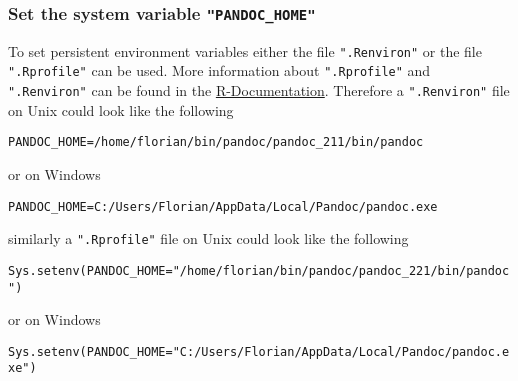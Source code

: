 \documentclass[a4paper]{article}\usepackage[]{graphicx}\usepackage[]{color}
\makeatletter
\newcommand{\hlstr}[1]{\textcolor[rgb]{0.741,0.553,0.545}{#1}}%
\newcommand{\hlstd}[1]{\textcolor[rgb]{0,0,0}{#1}}%
\newcommand{\hlkwc}[1]{\textcolor[rgb]{0,0,1}{#1}}%
\newcommand{\hlkwd}[1]{\textcolor[rgb]{0,0,0}{#1}}%
\newenvironment{kframe}{%
 \def\at@end@of@kframe{}%
 \ifinner\ifhmode%
  \def\at@end@of@kframe{\end{minipage}}%
  \begin{minipage}{\columnwidth}%
 \fi\fi%
 \def\FrameCommand##1{\hskip\@totalleftmargin \hskip-\fboxsep
 \colorbox{shadecolor}{##1}\hskip-\fboxsep
     \hskip-\linewidth \hskip-\@totalleftmargin \hskip\columnwidth}%
 \MakeFramed {\advance\hsize-\width
   \@totalleftmargin\z@ \linewidth\hsize
   \@setminipage}}%
 {\par\unskip\endMakeFramed%
 \at@end@of@kframe}
\newenvironment{knitrout}{}{} %
\newcommand{\proglang}[1]{\textsf{#1}}
\newcommand{\code}[1]{\texttt{#1}}
\makeatother
\begin{document}
\subsubsection{Set the system variable \code{"PANDOC\_HOME"}}
To set persistent environment variables either the file \code{".Renviron"}
or the file \code{".Rprofile"} can be used. More information about
\code{".Rprofile"} and \code{".Renviron"} can be found in the
\href{https://stat.ethz.ch/R-manual/R-devel/library/base/html/Startup.html}{R-Documentation}.
Therefore a \code{".Renviron"} file on \proglang{Unix} could look like the following
\begin{verbatim}
PANDOC_HOME=/home/florian/bin/pandoc/pandoc_211/bin/pandoc
\end{verbatim}
or on \proglang{Windows}
\begin{verbatim}
PANDOC_HOME=C:/Users/Florian/AppData/Local/Pandoc/pandoc.exe
\end{verbatim}
similarly a \code{".Rprofile"} file on \proglang{Unix} could look like the following
\begin{knitrout}
\color{fgcolor}\begin{kframe}
\begin{alltt}
\hlkwd{Sys.setenv}\hlstd{(}\hlkwc{PANDOC_HOME}\hlstd{=}\hlstr{"/home/florian/bin/pandoc/pandoc_221/bin/pandoc"}\hlstd{)}
\end{alltt}
\end{kframe}
\end{knitrout}
or on \proglang{Windows}
\begin{knitrout}
\color{fgcolor}\begin{kframe}
\begin{alltt}
\hlkwd{Sys.setenv}\hlstd{(}\hlkwc{PANDOC_HOME}\hlstd{=}\hlstr{"C:/Users/Florian/AppData/Local/Pandoc/pandoc.exe"}\hlstd{)}
\end{alltt}
\end{kframe}
\end{knitrout}
\end{document}
